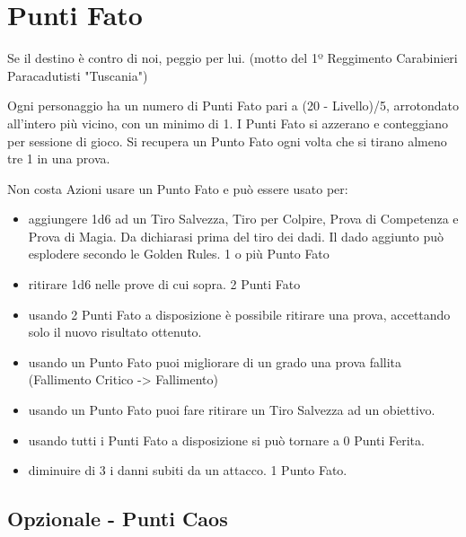\section{Punti Fato}\label{puntifato}

\begin{changemargin}{0.3cm}{0.3cm}\begin{enfasi}{Se il destino è contro di noi, peggio per lui. (motto del 1º Reggimento Carabinieri Paracadutisti "Tuscania")}\end{enfasi}\end{changemargin}

\medskip

Ogni personaggio ha un numero di Punti Fato pari a (20 - Livello)/5, arrotondato all'intero più vicino, con un minimo di 1. I Punti Fato si azzerano e conteggiano per sessione di gioco. 
Si recupera un Punto Fato ogni volta che si tirano almeno tre 1 in una prova.

Non costa Azioni usare un Punto Fato e può essere usato per: 

\noindent\begin{itemize}[leftmargin=*] \setlength{\itemsep}{0pt}
\item aggiungere 1d6 ad un Tiro Salvezza, Tiro per Colpire, Prova di Competenza e Prova di Magia. Da dichiarasi prima del tiro dei dadi. Il dado aggiunto può esplodere secondo le Golden Rules. 1 o più Punto Fato
\item ritirare 1d6 nelle prove di cui sopra. 2 Punti Fato
\item usando 2 Punti Fato a disposizione è possibile ritirare una prova, accettando solo il nuovo risultato ottenuto.
\item usando un Punto Fato puoi migliorare di un grado una prova fallita (Fallimento Critico -> Fallimento)
\item usando un Punto Fato puoi fare ritirare un Tiro Salvezza ad un obiettivo.
\item usando tutti i Punti Fato a disposizione si può tornare a 0 Punti Ferita.
\item diminuire di 3 i danni subiti da un attacco. 1 Punto Fato.
\end{itemize}

\subsection*{Opzionale - Punti Caos}

